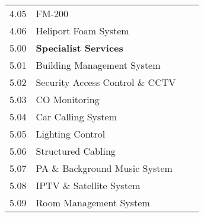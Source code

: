 \begin{longtable}{lll@{}l@{}}
4.05	&FM-200		&&\\
4.06	&Heliport Foam System	 &&\\	
\midrule
5.00	&\textbf{Specialist Services}		&&\\
5.01	&Building Management System	&&\\	
5.02	&Security Access Control \& CCTV	&&\\	
5.03	&CO Monitoring		&&\\
5.04	&Car Calling System		&&\\
5.05	&Lighting Control		&&\\
5.06	&Structured Cabling		&&\\
5.07	&PA \& Background Music System &&\\		
5.08	&IPTV \& Satellite System	&&\\	
5.09	&Room Management System	&&\\

\bottomrule
\end{longtable}

